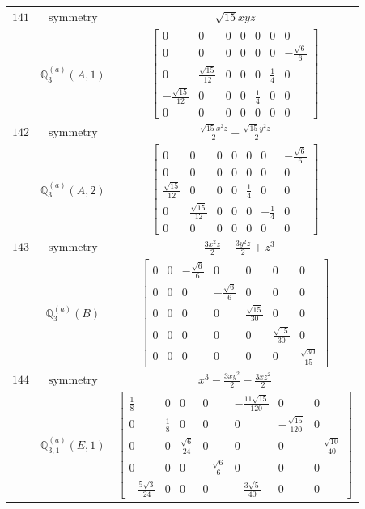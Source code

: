 \documentclass[fleqn,8pt,landscape]{jsarticle}
\begin{document}
\begin{longtable}{ccc}
$ 141 $ & $ \text{symmetry} $ & $ \sqrt{15} x y z $ \\
$  $ & $ \mathbb{Q}_{3}^{(a)}(A,1) $ & $ \begin{bmatrix} 0 & 0 & 0 & 0 & 0 & 0 & 0 \\ 0 & 0 & 0 & 0 & 0 & 0 & - \frac{\sqrt{6}}{6} \\ 0 & \frac{\sqrt{15}}{12} & 0 & 0 & 0 & \frac{1}{4} & 0 \\ - \frac{\sqrt{15}}{12} & 0 & 0 & 0 & \frac{1}{4} & 0 & 0 \\ 0 & 0 & 0 & 0 & 0 & 0 & 0 \end{bmatrix} $ \\ \hline
$ 142 $ & $ \text{symmetry} $ & $ \frac{\sqrt{15} x^{2} z}{2} - \frac{\sqrt{15} y^{2} z}{2} $ \\
$  $ & $ \mathbb{Q}_{3}^{(a)}(A,2) $ & $ \begin{bmatrix} 0 & 0 & 0 & 0 & 0 & 0 & - \frac{\sqrt{6}}{6} \\ 0 & 0 & 0 & 0 & 0 & 0 & 0 \\ \frac{\sqrt{15}}{12} & 0 & 0 & 0 & \frac{1}{4} & 0 & 0 \\ 0 & \frac{\sqrt{15}}{12} & 0 & 0 & 0 & - \frac{1}{4} & 0 \\ 0 & 0 & 0 & 0 & 0 & 0 & 0 \end{bmatrix} $ \\ \hline
$ 143 $ & $ \text{symmetry} $ & $ - \frac{3 x^{2} z}{2} - \frac{3 y^{2} z}{2} + z^{3} $ \\
$  $ & $ \mathbb{Q}_{3}^{(a)}(B) $ & $ \begin{bmatrix} 0 & 0 & - \frac{\sqrt{6}}{6} & 0 & 0 & 0 & 0 \\ 0 & 0 & 0 & - \frac{\sqrt{6}}{6} & 0 & 0 & 0 \\ 0 & 0 & 0 & 0 & \frac{\sqrt{15}}{30} & 0 & 0 \\ 0 & 0 & 0 & 0 & 0 & \frac{\sqrt{15}}{30} & 0 \\ 0 & 0 & 0 & 0 & 0 & 0 & \frac{\sqrt{30}}{15} \end{bmatrix} $ \\ \hline
$ 144 $ & $ \text{symmetry} $ & $ x^{3} - \frac{3 x y^{2}}{2} - \frac{3 x z^{2}}{2} $ \\
$  $ & $ \mathbb{Q}_{3,1}^{(a)}(E,1) $ & $ \begin{bmatrix} \frac{1}{8} & 0 & 0 & 0 & - \frac{11 \sqrt{15}}{120} & 0 & 0 \\ 0 & \frac{1}{8} & 0 & 0 & 0 & - \frac{\sqrt{15}}{120} & 0 \\ 0 & 0 & \frac{\sqrt{6}}{24} & 0 & 0 & 0 & - \frac{\sqrt{10}}{40} \\ 0 & 0 & 0 & - \frac{\sqrt{6}}{6} & 0 & 0 & 0 \\ - \frac{5 \sqrt{3}}{24} & 0 & 0 & 0 & - \frac{3 \sqrt{5}}{40} & 0 & 0 \end{bmatrix} $ \\ \hline

\end{longtable}
\end{document}

